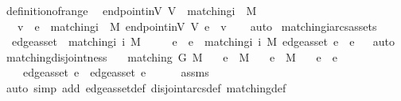 \begin{isabellebody}
\isanewline
\isanewline
{}\isamarkupfalse%
\ definition{\isacharunderscore}of{\isacharunderscore}range{\isacharcolon}\isanewline
\ \ {\isachardoublequoteopen}endpoint{\isacharunderscore}inV\ V{}\ {\isacharbackquote}\ matching{\isacharunderscore}i\ {}\ M\ {\isacharequal}\ \isanewline
\ \ {\isacharbraceleft}\ v{\isachardot}\ {\isasymexists}\ e\ {\isasymin}\ matching{\isacharunderscore}i\ {}\ M{\isachardot}\ endpoint{\isacharunderscore}inV\ V{}\ e\ {\isacharequal}\ v\ {\isacharbraceright}{\isachardoublequoteclose}%
\isadelimproof
\ %
\endisadelimproof
%
\isatagproof
{}\isamarkupfalse%
\ auto%
\endisatagproof
{\isafoldproof}%
%
\isadelimproof
%
\endisadelimproof
\isanewline
\isanewline
{}\isamarkupfalse%
\ matching{\isacharunderscore}i{\isacharunderscore}arcs{\isacharunderscore}as{\isacharunderscore}sets{\isacharcolon}\isanewline
\ \ {\isachardoublequoteopen}edge{\isacharunderscore}as{\isacharunderscore}set\ {\isacharbackquote}\ matching{\isacharunderscore}i\ i\ M\ {\isacharequal}\ \isanewline
\ \ {\isacharbraceleft}\ e{}{\isachardot}\ {\isasymexists}\ e\ {\isasymin}\ matching{\isacharunderscore}i\ i\ M{\isachardot}\ edge{\isacharunderscore}as{\isacharunderscore}set\ e\ {\isacharequal}\ e{}{\isacharbraceright}{\isachardoublequoteclose}%
\isadelimproof
\ %
\endisadelimproof
%
\isatagproof
{}\isamarkupfalse%
\ auto%
\endisatagproof
{\isafoldproof}%
%
\isadelimproof
%
\endisadelimproof
\isanewline
\isanewline
{}\isamarkupfalse%
\ matching{\isacharunderscore}disjointness{\isacharcolon}\isanewline
\ \ \ {\isachardoublequoteopen}matching\ G\ M{\isachardoublequoteclose}\isanewline
\ \ \ {\isachardoublequoteopen}e{}\ {\isasymin}\ M{\isachardoublequoteclose}\isanewline
\ \ \ {\isachardoublequoteopen}e{}\ {\isasymin}\ M{\isachardoublequoteclose}\isanewline
\ \ \ {\isachardoublequoteopen}e{}\ {\isasymnoteq}\ e{}{\isachardoublequoteclose}\isanewline
\ \ \ \ {\isachardoublequoteopen}edge{\isacharunderscore}as{\isacharunderscore}set\ e{}\ {\isasyminter}\ edge{\isacharunderscore}as{\isacharunderscore}set\ e{}\ {\isacharequal}\ {\isacharbraceleft}{\isacharbraceright}{\isachardoublequoteclose}\isanewline
%
\isadelimproof
\ \ %
\endisadelimproof
%
\isatagproof
{}\isamarkupfalse%
\ assms\ \isanewline
\ \ \isamarkupfalse%
\ {\isacharparenleft}auto\ simp\ add{\isacharcolon}\ edge{\isacharunderscore}as{\isacharunderscore}set{\isacharunderscore}def\ disjoint{\isacharunderscore}arcs{\isacharunderscore}def\ matching{\isacharunderscore}def{\isacharparenright}%

\end{isabellebody}
